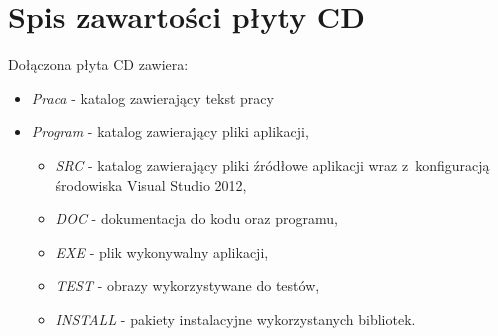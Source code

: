 \chapter{Spis zawartości płyty CD}
\label{cha:zawartoscCD}

Dołączona płyta CD zawiera:
\begin{itemize}
\item \emph{Praca} - katalog zawierający tekst pracy
\item \emph{Program} - katalog zawierający pliki aplikacji,
\begin{itemize}
\item \emph{SRC} - katalog zawierający pliki źródłowe aplikacji wraz z~konfiguracją środowiska Visual Studio 2012,
\item \emph{DOC} - dokumentacja do kodu oraz programu,
\item \emph{EXE} - plik wykonywalny aplikacji,
\item \emph{TEST} - obrazy wykorzystywane do testów,
\item \emph{INSTALL} - pakiety instalacyjne wykorzystanych bibliotek.
\end{itemize}
\end{itemize}
